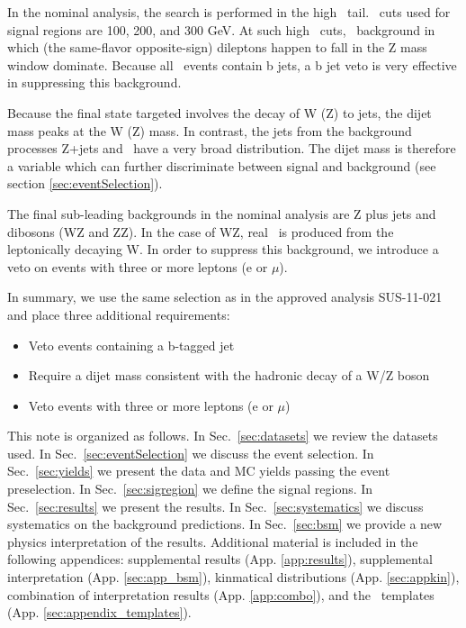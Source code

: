 In the nominal analysis, the search is performed in the high \MET\ tail.
\MET\ cuts used for signal regions are 100, 200, and 300 GeV.
At such high \MET\ cuts, \ttbar\ background in which (the same-flavor 
opposite-sign) dileptons happen to fall in the Z mass window dominate. 
Because all \ttbar\ events contain b jets, a b jet veto is 
very effective in suppressing this background.

Because the final state targeted involves the decay of W (Z) to jets, 
the dijet mass peaks at the W (Z) mass. In contrast, the jets from the
background processes Z+jets and \ttbar\ have a very broad distribution.
The dijet mass is therefore a variable which can further discriminate between 
signal and background (see section \ref{sec:eventSelection}).

The final sub-leading backgrounds in the nominal analysis are Z plus jets 
and dibosons (WZ and ZZ). In the case of WZ, real \MET\ is produced from 
the leptonically decaying W. In order to suppress this background, we 
introduce a veto on events with three or more leptons (e or $\mu$).

In summary, we use the same selection as in the approved analysis SUS-11-021 and
place three additional requirements:
\begin{itemize}
\item Veto events containing a b-tagged jet
\item Require a dijet mass consistent with the hadronic decay of a W/Z boson
\item Veto events with three or more leptons (e or $\mu$)
\end{itemize}

This note is organized as follows. 
In Sec.~\ref{sec:datasets} we review the datasets used.
In Sec.~\ref{sec:eventSelection} we discuss the event selection.
In Sec.~\ref{sec:yields} we present the data and MC yields passing the event preselection.
In Sec.~\ref{sec:sigregion} we define the signal regions.
In Sec.~\ref{sec:results} we present the results.
In Sec.~\ref{sec:systematics} we discuss systematics on the background predictions.
In Sec.~\ref{sec:bsm} we provide a new physics interpretation of the results.
Additional material is included in the following appendices: 
supplemental results (App. \ref{app:results}),
supplemental interpretation (App. \ref{sec:app_bsm}),
kinmatical distributions (App. \ref{sec:appkin}),
combination of interpretation results (App. \ref{app:combo}),
and the \MET\ templates (App. \ref{sec:appendix_templates}).

